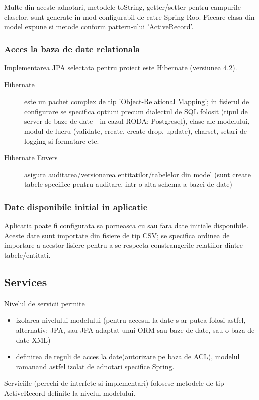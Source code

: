 Multe din aceste adnotari, metodele toString, getter/setter pentru
campurile claselor, sunt generate in mod configurabil de catre Spring Roo.
Fiecare clasa din model expune si metode conform pattern-ului 'ActiveRecord'. 

\subsubsection{Acces la baza de date relationala}
Implementarea JPA selectata pentru proiect este Hibernate (versiunea 4.2).
\begin{description}
\item[Hibernate] este un pachet complex de tip 'Object-Relational Mapping';
in fisierul de configurare se specifica optiuni precum dialectul de SQL folosit
(tipul de server de baze de date - in cazul RODA: Postgresql), clase ale
modelului, modul de lucru (validate, create, create-drop, update), 
charset, setari de logging si formatare etc.
\item[Hibernate Envers] asigura auditarea/versionarea entitatilor/tabelelor din
model (sunt create tabele specifice pentru auditare, intr-o alta schema a bazei
de date)
\end{description}

\subsubsection{Date disponibile initial in aplicatie}
Aplicatia poate fi configurata sa porneasca cu sau fara date initiale
disponibile.
Aceste date sunt importate din fisiere de tip CSV; se specifica ordinea de
importare a acestor fisiere pentru a se respecta constrangerile relatiilor
dintre tabele/entitati.

\subsection{Services}
Nivelul de servicii permite 
\begin{itemize}
  \item izolarea nivelului modelului (pentru accesul la
date s-ar putea folosi astfel, alternativ: JPA, sau JPA adaptat unui ORM sau
baze de date, sau o baza de date XML)
  \item definirea de reguli de acces la date(autorizare pe baza de ACL), modelul
  ramanand astfel izolat de adnotari specifice Spring.
\end{itemize} 
Serviciile (perechi de interfete si implementari) folosesc 
metodele de tip ActiveRecord definite la nivelul modelului.

